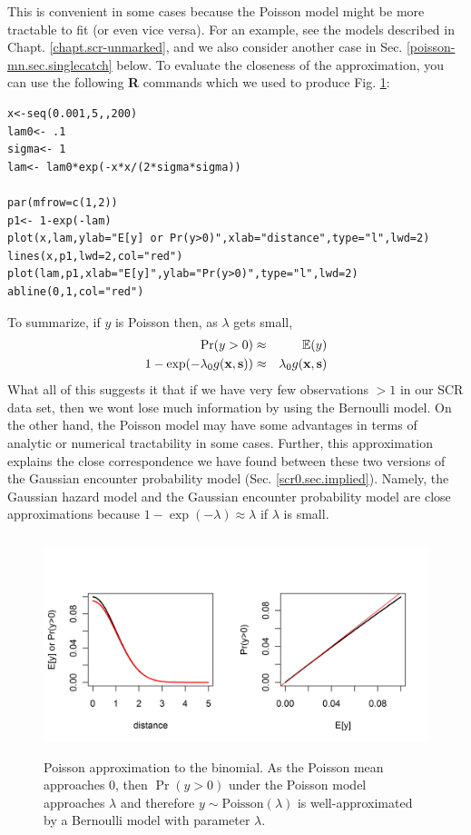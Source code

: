 This is convenient in some cases because the Poisson model might be
more tractable to fit (or even vice versa). For an example, see the
models described in Chapt. \ref{chapt.scr-unmarked}, and we also
consider another case in Sec. \ref{poisson-mn.sec.singlecatch}
below. To evaluate the closeness of the approximation, you can use the
following {\bf R} commands which we used to produce
Fig. \ref{poisson-mn.fig.poissonbern}:
\begin{samepage} %
{\small
\begin{verbatim}
x<-seq(0.001,5,,200)
lam0<- .1
sigma<- 1
lam<- lam0*exp(-x*x/(2*sigma*sigma))

par(mfrow=c(1,2))
p1<- 1-exp(-lam)
plot(x,lam,ylab="E[y] or Pr(y>0)",xlab="distance",type="l",lwd=2)
lines(x,p1,lwd=2,col="red")
plot(lam,p1,xlab="E[y]",ylab="Pr(y>0)",type="l",lwd=2)
abline(0,1,col="red")
\end{verbatim}
}
\end{samepage}

To summarize, if $y$ is Poisson then, as $\lambda$ gets small,
\begin{eqnarray*}
\Pr(y>0)  & \approx & \mathbb{E}(y)  \\
1-\exp(-\lambda_{0} g({\bf x},{\bf s})) &\approx &  \lambda_{0} g({\bf
  x},{\bf s})
\label{poisson-mn.eq.cloglog-inverse}
\end{eqnarray*}
What all of this suggests it that if we have very few observations
$>1$ in our SCR data set, then we wont lose much information by using
the Bernoulli model. On the other hand, the Poisson model may have
some advantages in terms of analytic or numerical tractability in some
cases. Further, this approximation explains the close correspondence
we have found between these two versions of the Gaussian encounter
probability model (Sec. \ref{scr0.sec.implied}).  Namely, the Gaussian
hazard model and the Gaussian encounter probability model are close
approximations because $1-\exp(-\lambda) \approx \lambda$ if $\lambda$
is small.



\begin{figure}
\centering
\includegraphics[width=5in,height=2.5in]{Ch5-PoisMn/figs/Poisson-Bern.png}
\caption{
Poisson approximation to the binomial. As the Poisson mean
approaches 0, then $\Pr(y>0)$ under the Poisson model approaches
$\lambda$ and therefore $y \sim \mbox{Poisson}(\lambda)$ is
well-approximated by a Bernoulli model with parameter $\lambda$.  }
\label{poisson-mn.fig.poissonbern}
\end{figure}


